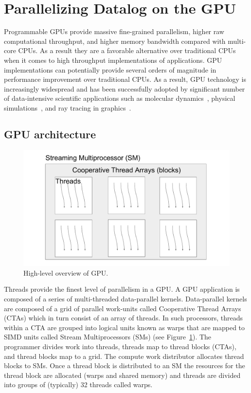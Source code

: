 
\section{Parallelizing Datalog on the GPU}
%
Programmable GPUs provide massive fine-grained parallelism, higher raw computational throughput, 
and higher memory bandwidth compared with multi-core CPUs. As a result they are a favorable  
alternative over traditional CPUs when it comes to high throughput implementations of applications.
GPU implementations can potentially provide several orders of magnitude in performance 
improvement over traditional CPUs. As a result, GPU technology is increasingly widespread
and has been successfully adopted by significant number of data-intensive
scientific applications such as molecular dynamics~\cite{ANDERSON20085342}, physical simulations~\cite{EGVE:IPT_EGVE2005:105-111},
and ray tracing in graphics~\cite{Parker:2010:OGP:1833349.1778803}.

\subsection{GPU architecture}
\begin{figure}
	\centering
	\vspace{-0.1in}
	\includegraphics[width=.99\linewidth]{GPU.pdf}
	\caption{High-level overview of GPU. \label{fig:gpu}}
	\vspace{-0.2in}
\end{figure}

Threads provide the finest level of parallelism in a GPU.
A GPU application is composed of a series of multi-threaded data-parallel kernels. 
Data-parallel kernels are composed of a grid of parallel work-units called Cooperative Thread Arrays
(CTAs) which in turn consist of an array of threads. In such processors, threads within a CTA are grouped into logical units
known as warps that are mapped to SIMD units called Stream Multiprocessors (SMs) (see Figure~\ref{fig:gpu}).
The programmer divides work into threads, threads map to thread blocks (CTAs), and thread blocks map to a grid. 
The compute work distributor allocates thread blocks to SMs. 
Once a thread block is distributed to an SM the resources for the thread block are allocated 
(warps and shared memory) and threads are divided into groups of (typically) 32 threads called warps. 


